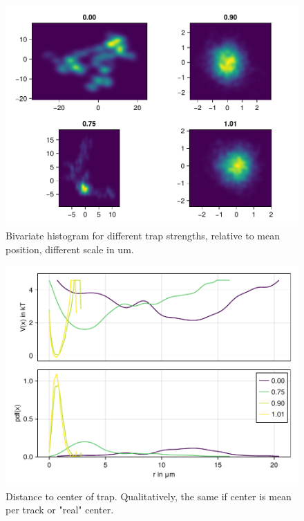\documentclass[
    parskip=half, 
    twoside=false,
    twocolumn=true,
    fontsize=11pt,
]{scrarticle}
\begin{document}
\begin{figure}[h]
    \centering
    \includegraphics{figures/01_03_1_bivariate.pdf}
    \caption{Bivariate histogram for different trap strengths, relative to mean position, different scale in um.}
\end{figure}

\begin{figure}[h]
    \centering
    \includegraphics{figures/01_03_2_radial.pdf}
    \caption{Distance to center of trap. Qualitatively, the same if center is mean per track or "real" center.}
\end{figure}
\end{document}
